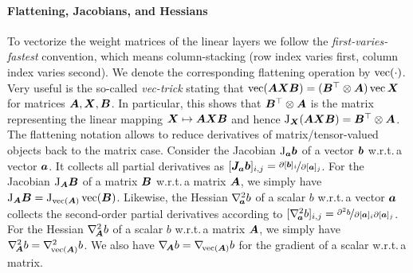 \paragraph{Flattening, Jacobians, and Hessians}
To vectorize the weight matrices of the linear layers we follow the %
\emph{first-varies-fastest} convention, which means column-stacking (row index varies first, column index varies second).
We denote the corresponding flattening operation by $\operatorname{vec}(\cdot)$.
Very useful is the so-called \emph{vec-trick} stating that $\operatorname{vec}({\bm{A}}{\bm{X}}{\bm{B}}) = ({\bm{B}}^\top\otimes {\bm{A}})\operatorname{vec}{{\bm{X}}}$
for matrices ${\bm{A}}, {\bm{X}}, {\bm{B}}$.
In particular, this shows that ${\bm{B}}^\top\otimes {\bm{A}}$ is the matrix representing the linear mapping ${\bm{X}}\mapsto {\bm{A}}{\bm{X}}{\bm{B}}$ and hence $\mathrm{J}_{\bm{X}}({\bm{A}}{\bm{X}}{\bm{B}}) = {\bm{B}}^\top\otimes {\bm{A}}$.
The flattening notation allows to reduce derivatives of matrix/tensor-valued objects back to the matrix case.
Consider the Jacobian $\mathrm{J}_{{\bm{a}}}{\bm{b}}$ of a vector ${\bm{b}}$ w.r.t.\,a vector ${\bm{a}}$.
It collects all partial derivatives as $[{\bm{J}}_{{\bm{a}}}{\bm{b}}]_{i,j} = \nicefrac{\partial [{\bm{b}}]_i}{\partial [{\bm{a}}]_j}$.
For the Jacobian $\mathrm{J}_{{\bm{A}}}{\bm{B}}$ of a matrix ${\bm{B}}$ w.r.t.\,a matrix ${\bm{A}}$, we simply have $\mathrm{J}_{{\bm{A}}} {\bm{B}} = \mathrm{J}_{\operatorname{vec}( {\bm{A}} )}\operatorname{vec}({\bm{B}})$.
Likewise, the Hessian $\nabla_{\!{{\bm{a}}}}^{2}b$ of a scalar $b$ w.r.t.\,a vector ${\bm{a}}$ collects the second-order partial derivatives according to $[\nabla_{\!{{\bm{a}}}}^{2}b]_{i,j} = \nicefrac{\partial^2 b}{\partial [{\bm{a}}]_i \partial [{\bm{a}}]_j}$.
For the Hessian $\nabla_{\!{{\bm{A}}}}^{2} b$ of a scalar $b$ w.r.t.\,a matrix ${\bm{A}}$, we simply have $\nabla_{\!{{\bm{A}}}}^{2} b = \nabla_{\!{\operatorname{vec}({\bm{A}})}}^{2}b$.
We also have $\nabla_{\!{{\bm{A}}}} b = \nabla_{\!{\operatorname{vec}({\bm{A}})}} b$ for the gradient of a scalar w.r.t.\,a matrix.





